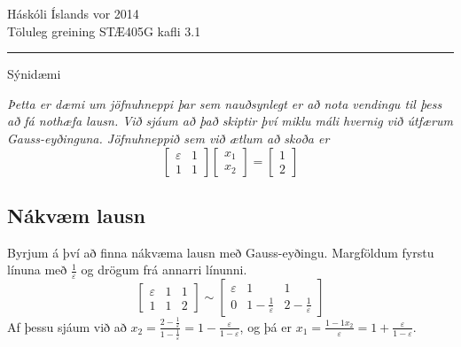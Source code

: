 \documentclass[14pt,a4paper]{article}
\renewcommand{\epsilon}{\varepsilon}
\begin{document}
\noindent Háskóli Íslands \hfill vor 2014\\
Töluleg greining STÆ405G \hfill kafli 3.1
\rule[8pt]{\textwidth}{1pt}


\bigskip

\begin{center}
{\large Sýnidæmi}
\end{center}

\emph{Þetta er dæmi um jöfnuhneppi þar sem nauðsynlegt er að nota vendingu til þess
að fá nothæfa lausn. Við sjáum að það skiptir því miklu máli hvernig við útfærum 
Gauss-eyðinguna.
Jöfnuhneppið sem við ætlum að skoða er }
$$\left[
\begin{array}{ll}
\epsilon & 1 \\
1 & 1 
\end{array}\right]
\left[
\begin{array}{l}
x_1\\
x_2
\end{array}\right]
= \left[\begin{array}{l}
1\\
2
\end{array}\right]
$$

\medskip

\subsection*{Nákvæm lausn}
Byrjum á því að finna nákvæma lausn með Gauss-eyðingu.
Margföldum fyrstu línuna með $\frac 1\epsilon$ og drögum frá
annarri línunni.
$$
\left[
\begin{array}{ll|l}
\epsilon & 1 & 1\\
1 & 1 & 2
\end{array}\right]
\sim
\left[
\begin{array}{ll|l}
\epsilon & 1 & 1\\
0 & 1-\frac 1\epsilon & 2 -\frac 1\epsilon
\end{array}\right]
$$
Af þessu sjáum við að 
$x_2 = \frac{2-\frac 1\epsilon}{1-\frac 1\epsilon} = 1 - \frac{\epsilon}{1-\epsilon}$,
og þá er 
$x_1 = \frac{1-1 x_2}{\epsilon} = 1+ \frac{\epsilon}{1-\epsilon}$.
\end{document}
